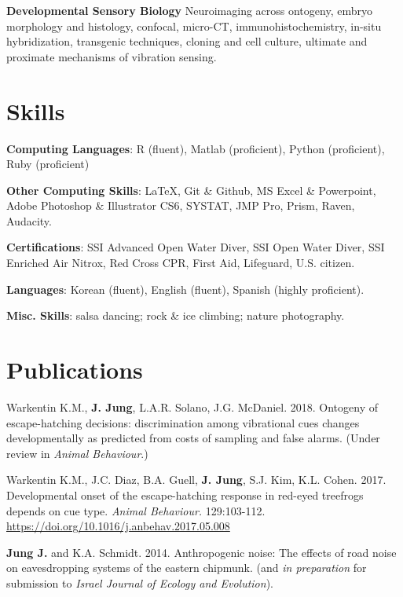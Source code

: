 \documentclass[margin,line]{res}
\begin{document}
\begin{resume}
\vspace{-.3cm}
{\bf Developmental Sensory Biology} Neuroimaging across ontogeny, embryo morphology and histology, confocal, micro-CT, immunohistochemistry, in-situ hybridization, transgenic techniques, cloning and cell culture, ultimate and proximate mechanisms of vibration sensing. 

\section{\sc Skills} 
{\bf Computing Languages}:  R (fluent), Matlab (proficient), Python (proficient), Ruby (proficient)
\vspace*{-3mm}

{\bf Other Computing Skills}: \LaTeX, Git \& Github, MS Excel \& Powerpoint, Adobe Photoshop \& Illustrator CS6, SYSTAT, JMP Pro, Prism, Raven, Audacity. 
\vspace*{-3mm}

{\bf Certifications}: SSI Advanced Open Water Diver, SSI Open Water Diver,  SSI Enriched Air Nitrox, Red Cross CPR, First Aid, Lifeguard, U.S. citizen. 
\vspace*{-3mm}

{\bf Languages}: Korean (fluent), English (fluent), Spanish (highly proficient). 
\vspace*{-3mm}

{\bf Misc. Skills}: salsa dancing; rock \& ice climbing; nature photography. 

\section{\sc Publications}

Warkentin K.M., {\bf J. Jung}, L.A.R. Solano, J.G. McDaniel. 2018. {Ontogeny of escape-hatching decisions: discrimination among vibrational cues changes developmentally as predicted from costs of sampling and false alarms.} (Under review in {\it Animal Behaviour}.) 

\vspace{-.3cm}
Warkentin K.M., J.C. Diaz, B.A. Guell, {\bf J. Jung}, S.J. Kim, K.L. Cohen. 2017. {Developmental onset of the escape-hatching response in red-eyed treefrogs depends on cue type.} {\it Animal Behaviour.} {129:103-112.} \href{http://www.sciencedirect.com/science/article/pii/S0003347217301458}{\ttfamily https://doi.org/10.1016/j.anbehav.2017.05.008}

\vspace{-.3cm}
{\bf Jung J.} and K.A. Schmidt. 2014. {Anthropogenic noise: The effects of road noise on eavesdropping systems of the eastern chipmunk.} \href{http://www.caryinstitute.org/sites/default/files/public/reprints/jung_2014_REU.pdf}{} (and {\it in preparation} for submission to {\it Israel Journal of Ecology and Evolution}).
  


\end{resume}
\end{document}
